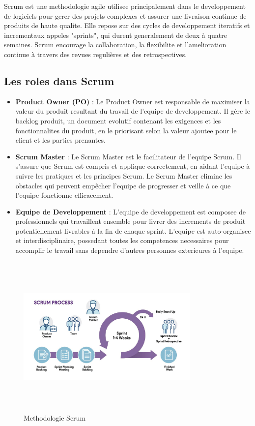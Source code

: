 Scrum est une methodologie agile utilisee principalement dans le developpement de logiciels pour gerer des projets complexes et assurer une livraison continue de produits de haute qualite. Elle repose sur des cycles de developpement iteratifs et incrementaux appeles "sprints", qui durent generalement de deux à quatre semaines. Scrum encourage la collaboration, la flexibilite et l'amelioration continue à travers des revues regulières et des retrospectives.

\subsection{Les roles dans Scrum}

\begin{itemize}
    \item \textbf{Product Owner (PO)} : Le Product Owner est responsable de maximiser la valeur du produit resultant du travail de l'equipe de developpement. Il gère le backlog produit, un document evolutif contenant les exigences et les fonctionnalites du produit, en le priorisant selon la valeur ajoutee pour le client et les parties prenantes.
    
    \item \textbf{Scrum Master} : Le Scrum Master est le facilitateur de l'equipe Scrum. Il s'assure que Scrum est compris et applique correctement, en aidant l'equipe à suivre les pratiques et les principes Scrum. Le Scrum Master elimine les obstacles qui peuvent empêcher l'equipe de progresser et veille à ce que l'equipe fonctionne efficacement.
    
    \item \textbf{Equipe de Developpement} : L'equipe de developpement est composee de professionnels qui travaillent ensemble pour livrer des increments de produit potentiellement livrables à la fin de chaque sprint. L'equipe est auto-organisee et interdisciplinaire, possedant toutes les competences necessaires pour accomplir le travail sans dependre d'autres personnes exterieures à l'equipe.
\end{itemize}

\begin{figure}[H]
\centering
\includegraphics[height=8cm , width=0.8\textwidth]{assets/images/scrum.jpg}
\caption{Methodologie Scrum}
\label{fig:scrum}
\end{figure}


